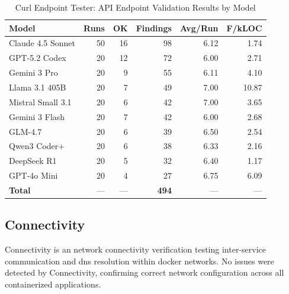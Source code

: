 \begin{table}[htbp]
    \centering
    \caption{Curl Endpoint Tester: API Endpoint Validation Results by Model}
    \label{tab:tool_curlendpoint}
    \small
    \begin{tabular}{@{} l r r r r r @{}}
        \toprule
        \textbf{Model} & \textbf{Runs} & \textbf{OK} & \textbf{Findings} & \textbf{Avg/Run} & \textbf{F/kLOC} \\
        \midrule
        Claude 4.5 Sonnet & 50 & 16 & 98 & 6.12 & 1.74 \\
        GPT-5.2 Codex & 20 & 12 & 72 & 6.00 & 2.71 \\
        Gemini 3 Pro & 20 & 9 & 55 & 6.11 & 4.10 \\
        Llama 3.1 405B & 20 & 7 & 49 & 7.00 & 10.87 \\
        Mistral Small 3.1 & 20 & 6 & 42 & 7.00 & 3.65 \\
        Gemini 3 Flash & 20 & 7 & 42 & 6.00 & 2.68 \\
        GLM-4.7 & 20 & 6 & 39 & 6.50 & 2.54 \\
        Qwen3 Coder+ & 20 & 6 & 38 & 6.33 & 2.16 \\
        DeepSeek R1 & 20 & 5 & 32 & 6.40 & 1.17 \\
        GPT-4o Mini & 20 & 4 & 27 & 6.75 & 6.09 \\
        \midrule
        \textbf{Total} & --- & --- & \textbf{494} & --- & --- \\
        \bottomrule
    \end{tabular}
\end{table}

\subsection{Connectivity}

Connectivity is an network connectivity verification testing inter-service communication and dns resolution within docker networks.
 No issues were detected by Connectivity, confirming correct network configuration across all containerized applications.

